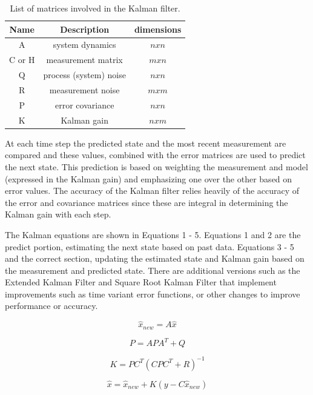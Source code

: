 \documentclass[11pt]{article}
\begin{document}
\begin{table}
\caption{List of matrices involved in the Kalman filter.} 
\label{mats}
\centering
\begin{tabular}{||c c c||} 
\hline
Name & Description & dimensions \\ [0.5ex] 
\hline\hline
A & system dynamics & $nxn$\\
\hline
C or H & measurement matrix & $mxn$\\
\hline
Q & process (system) noise & $nxn$\\
\hline
R & measurement noise & $mxm$\\
\hline
P & error covariance & $nxn$\\
\hline
K & Kalman gain & $nxm$\\
\hline
\end{tabular}
\end{table}

At each time step the predicted state and the most recent measurement are compared and these values, combined with the error matrices are used to predict the next state. This prediction is based on weighting the measurement and model (expressed in the Kalman gain) and emphasizing one over the other based on error values. The accuracy of the Kalman filter relies heavily of the accuracy of the error and covariance matrices since these are integral in determining the Kalman gain with each step.

The Kalman equations are shown in Equations 1 - 5. Equations 1 and 2 are the predict portion, estimating the next state based on past data. Equations 3 - 5 and the correct section, updating the estimated state and Kalman gain based on the measurement and predicted state. There are additional versions such as the Extended Kalman Filter and Square Root Kalman Filter that implement improvements such as time variant error functions, or other changes to improve performance or accuracy.

\begin{equation}
\hat{x}_{new} = A\hat{x}
\end{equation}

\begin{equation}
P=APA^T+Q
\end{equation}

\begin{equation}
K = PC^T(CPC^T+R)^{-1}
\end{equation}

\begin{equation}
\hat{x}=\hat{x}_{new} + K(y-C\hat{x}_{new})
\end{equation}
\end{document}
